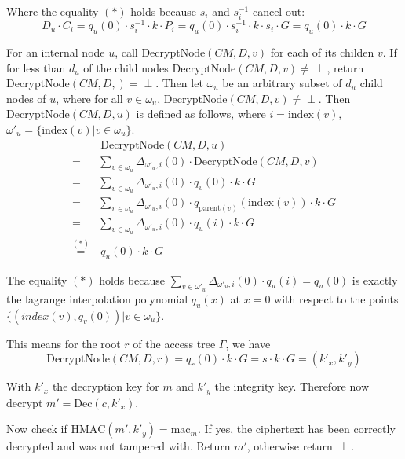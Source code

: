 Where the equality $(*)$ holds because $s_i$ and $s_i^{-1}$ cancel out: 
\begin{equation*}
    D_u \cdot C_i = q_u(0) \cdot s_i^{-1} \cdot k \cdot P_i = q_u(0) \cdot s_i^{-1} \cdot k \cdot s_i \cdot G = q_u(0) \cdot k \cdot G
\end{equation*}

For an internal node $u$, call $\text{DecryptNode}(CM, D, v)$ for each of its childen $v$. If for less than $d_u$ of the child nodes $\text{DecryptNode}(CM, D, v) \neq \perp$, return $\text{DecryptNode}(CM, D, )=\perp$.
Then let $\omega_u$ be an arbitrary subset of $d_u$ child nodes of $u$, where for all $v \in \omega_u$, $\text{DecryptNode}(CM, D, v) \neq \perp$.
Then $\text{DecryptNode}(CM, D, u)$ is defined as follows, where $i = \text{index}(v)$, $\omega'_u = \{\text{index}(v) | v \in \omega_u\}$.
\begin{equation*}
    \begin{split}
        &~\text{DecryptNode}(CM, D, u)\\
        =& \sum_{v \in \omega_u} \Delta_{\omega'_u, i}(0) \cdot \text{DecryptNode}(CM, D, v)\\
        =& \sum_{v \in \omega_u} \Delta_{\omega'_u, i}(0) \cdot q_v(0) \cdot k \cdot G\\
        =& \sum_{v \in \omega_u} \Delta_{\omega'_u, i}(0) \cdot q_{\text{parent}(v)}(\text{index}(v)) \cdot k \cdot G\\
        =& \sum_{v \in \omega_u} \Delta_{\omega'_u, i}(0) \cdot q_u(i) \cdot k \cdot G\\
        \stackrel{(*)}{=}&~q_u(0) \cdot k \cdot G
    \end{split}
\end{equation*}

The equality $(*)$ holds because $\sum_{v \in \omega'_u} \Delta_{\omega'_u, i}(0) \cdot q_u(i) = q_u(0)$ is exactly the lagrange interpolation polynomial $q_u(x)$ at $x = 0$ with respect to the points $\{(index(v), q_v(0)) | v \in \omega_u\}$. 

This means for the root $r$ of the access tree $\Gamma$, we have
\begin{equation*}
    \text{DecryptNode}(CM, D, r) =  q_r(0) \cdot k \cdot G = s \cdot k \cdot G = (k'_x, k'_y)
\end{equation*}

With $k'_x$ the decryption key for $m$ and $k'_y$ the integrity key. Therefore now decrypt $m' = \text{Dec}(c, k'_x)$.

Now check if $\text{HMAC}(m', k'_y) = \text{mac}_m$. If yes, the ciphertext has been correctly decrypted and was not tampered with. Return $m'$, otherwise return $\perp$.